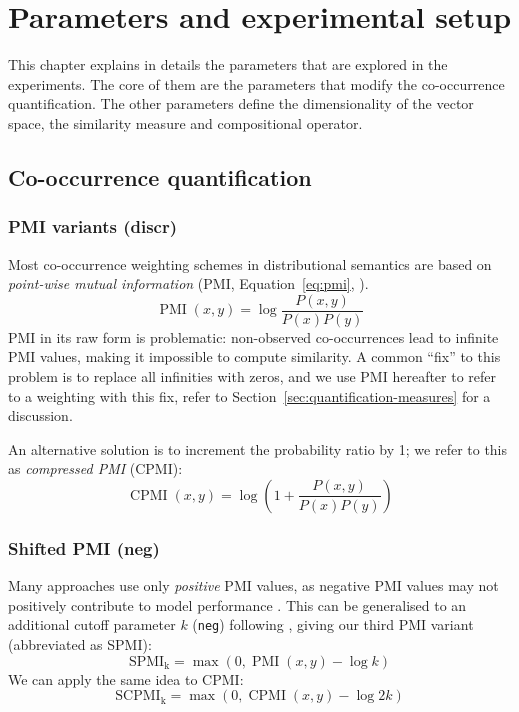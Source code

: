 \chapter{Parameters and experimental setup}
\label{sec:parameters}

This chapter explains in details the parameters that are explored in the experiments. The core of them are the parameters that modify the co-occurrence quantification. The other parameters define the dimensionality of the vector space, the similarity measure and compositional operator.

\section{Co-occurrence quantification}
\label{sec:quantification}

\subsection{PMI variants (discr)}
\label{sec:pmi-variants}

Most co-occurrence weighting schemes in distributional semantics are based on \emph{point-wise mutual information} (PMI, Equation~\ref{eq:pmi}, ).
%
\begin{equation}
  \label{eq:pmi}
  \operatorname{PMI}(x, y) = \log\frac{P(x,y)}{P(x)P(y)}
\end{equation}
%
PMI in its raw form is problematic: non-observed co-occurrences lead to infinite PMI values, making it impossible to compute similarity. A common ``fix'' to this problem is to replace all infinities with zeros, and we use PMI hereafter to refer to a weighting with this fix, refer to Section~\ref{sec:quantification-measures} for a discussion.

An alternative solution is to increment the probability ratio by 1; we refer to this as \textit{compressed PMI} (CPMI):
%
\begin{equation}
  \label{eq:cpmi}
  \operatorname{CPMI}(x, y) = \log\left( 1 +  \frac{P(x,y)}{P(x)P(y)} \right)
\end{equation}

\subsection{Shifted PMI (neg)}
\label{sec:shifted-pmi}

Many approaches use only \emph{positive} PMI values, as  negative PMI values may not positively contribute to model performance \cite{Turney:2010:FMV:1861751.1861756}. This can be generalised to an additional cutoff parameter $k$ (\texttt{neg}) following , giving our third PMI variant (abbreviated as SPMI):
%
\begin{equation}
  \label{eq:ppmi}
  \operatorname{SPMI_k} = \max (0, \operatorname{PMI}(x, y) - \log k)
\end{equation}
%
We can apply the same idea to CPMI:
%
\begin{equation}
  \label{eq:pcpmi}
  \operatorname{SCPMI_k} = \max (0, \operatorname{CPMI}(x, y) - \log 2k)
\end{equation}

